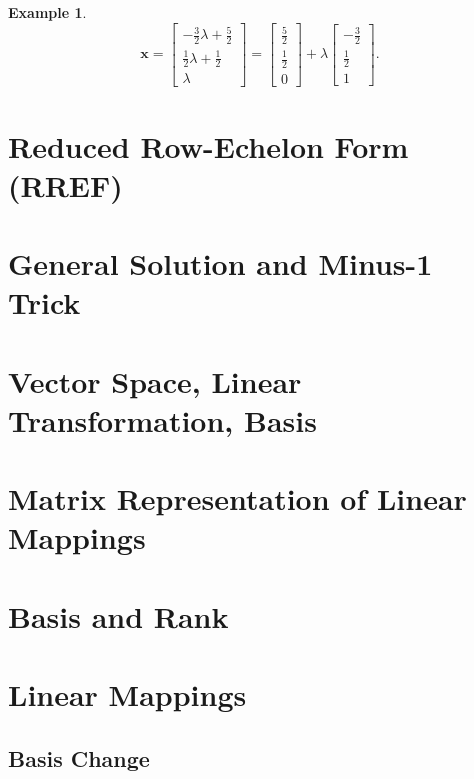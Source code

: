 \documentclass[12pt,openany]{book}
\theoremstyle{definition}
\newtheorem{example}{Example}[chapter]
\begin{document}
\begin{example}
\[		\textbf{x}=\begin{bmatrix}
			-\frac{3}{2}\lambda+\frac{5}{2}\\ \frac{1}{2}\lambda+\frac{1}{2}\\ \lambda
		\end{bmatrix}=\begin{bmatrix}
		\frac{5}{2}\\ \frac{1}{2}\\ 0
		\end{bmatrix}+\lambda\begin{bmatrix}
			-\frac{3}{2}\\ \frac{1}{2}\\ 1
		\end{bmatrix}.
		\]
	\end{example}

	\section{Reduced Row-Echelon Form (RREF)}
	\section{General Solution and Minus-1 Trick}
	
	\section{Vector Space, Linear Transformation, Basis}
	
	\newpage
	\section{Matrix Representation of Linear Mappings}
	
	\section{Basis and Rank}
	\section{Linear Mappings}
	\subsection{Basis Change}
	
\end{document}
